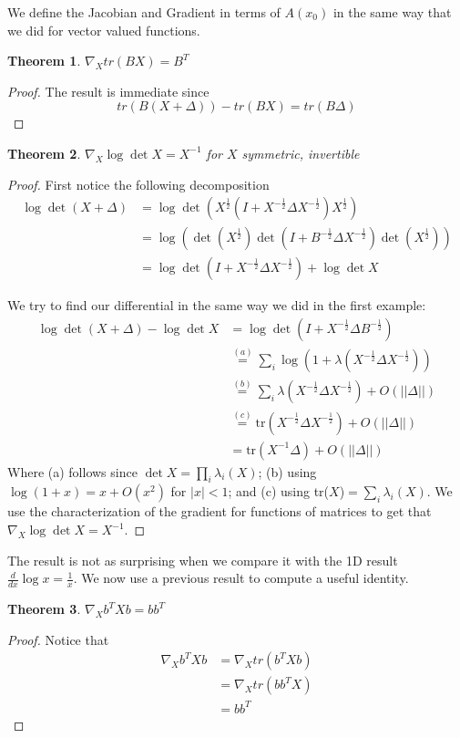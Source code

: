 \documentclass[]{article}
\theoremstyle{mattstyle}
\newtheorem{theorem}{Theorem}[section]
\theoremstyle{definition}
\begin{document}
We define the Jacobian and Gradient in terms of $A(x_0)$ in the same way that we did for vector valued functions.

\begin{theorem}
	$\nabla_{X} tr(BX) = B^T$
\end{theorem}
\begin{proof}
	The result is immediate since
	$$tr(B(X+\Delta)) - tr(BX) = tr(B\Delta)$$
\end{proof}

\begin{theorem}
	$\nabla_{X} \log \det X = X^{-1}$ for $X$ symmetric, invertible
\end{theorem}
\begin{proof}
	First notice the following decomposition
\begin{align*}
\log \det (X + \Delta) &= \log \det\left(X^{\frac{1}{2}}\left(I + X^{-\frac{1}{2}}\Delta X^{-\frac{1}{2}}\right)X^{\frac{1}{2}}\right)\\
&= \log\left(\det\left( X^{\frac{1}{2}}\right) \det\left(I + B^{-\frac{1}{2}}\Delta X^{-\frac{1}{2}}\right) \det\left(X^{\frac{1}{2}}\right) \right)\\
&=\log\det\left(I + X^{-\frac{1}{2}}\Delta X^{-\frac{1}{2}}\right)+\log\det X
\end{align*}

We try to find our differential in the same way we did in the first example:
\begin{align*}
\log \det (X + \Delta) - \log\det X &= \log\det\left(I + X^{-\frac{1}{2}}\Delta B^{-\frac{1}{2}}\right)\\
&\overset{(a)}{=} \sum_{i} \log\left(1 + \lambda\left(X^{-\frac{1}{2}}\Delta X^{-\frac{1}{2}}\right)\right)\\
&\overset{(b)}{=} \sum_{i}\lambda\left(X^{-\frac{1}{2}}\Delta X^{-\frac{1}{2}}\right) + O(||\Delta||)\\
&\overset{(c)}{=} \text{tr}\left(X^{-\frac{1}{2}}\Delta X^{-\frac{1}{2}}\right) + O(||\Delta||)\\
&= \text{tr}(X^{-1}\Delta) + O(||\Delta||)
\end{align*}
Where (a) follows since $\det X = \prod_i \lambda_i(X)$; (b) using $\log(1+x)=x+O(x^2)$ for $|x|<1$; and (c) using tr($X$)$=\sum_i \lambda_i(X)$. 
We use the characterization of the gradient for functions of matrices to get that $\nabla_X \log\det X = X^{-1}$.
\end{proof}
The result is not as surprising when we compare it with the 1D result $\frac{d}{dx}\log x = \frac{1}{x}$. We now use a previous result to compute a useful identity.
\begin{theorem}
	$\nabla_{X} b^TXb = bb^T$
\end{theorem}
\begin{proof}
	Notice that
	\begin{align*}
	\nabla_{X} b^TXb &= \nabla_{X} tr(b^TXb)\\
	&= \nabla_{X} tr(bb^TX)\\
	&= bb^T
	\end{align*}
\end{proof}
\end{document}
